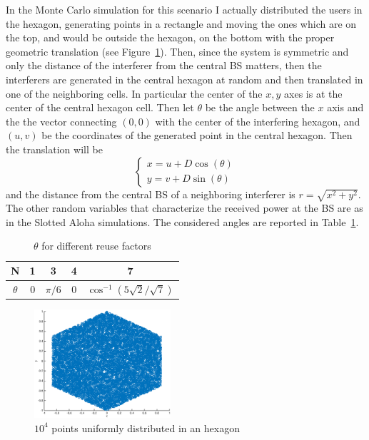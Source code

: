 \documentclass[10pt]{article}
\begin{document}
In the Monte Carlo simulation for this scenario I actually distributed the users in the hexagon, generating points in a rectangle and moving the ones which are on the top, and would be outside the hexagon, on the bottom with the proper geometric translation (see Figure~\ref{fig:hexauni}). Then, since the system is symmetric and only the distance of the interferer from the central BS matters, then the interferers are generated in the central hexagon at random and then translated in one of the neighboring cells. In particular the center of the $x, y$ axes is at the center of the central hexagon cell. Then let $\theta$ be the angle between the $x$ axis and the the vector connecting $(0, 0)$ with the center of the interfering hexagon, and $(u, v)$ be the coordinates of the generated point in the central hexagon. Then the translation will be
\begin{equation}
  \begin{cases}
  x = u + D\cos(\theta) \\
  y = v + D\sin(\theta)
  \end{cases}
\end{equation}
and the distance from the central BS of a neighboring interferer is $r = \sqrt{x^2 + y^2}$. The other random variables that characterize the received power at the BS are as in the Slotted Aloha simulations. The considered angles are reported in Table~\ref{table:angles}.
\begin{table}[h!]
\centering
  \begin{tabular}{c|c|c|c|c}
  N & 1 & 3 & 4 & 7 \\ \hline
  $\theta$ & 0 & $\pi/6$ & 0 & $\cos^{-1}({5\sqrt{2}/\sqrt{7}})$
  \end{tabular}
  \caption{$\theta$ for different reuse factors}
  \label{table:angles}
\end{table}

\begin{figure}[h!]
	\centering
	\includegraphics[width = 0.45\textwidth]{hexauni}
	\caption{$10^4$ points uniformly distributed in an hexagon}
	\label{fig:hexauni}
\end{figure}
\end{document}
